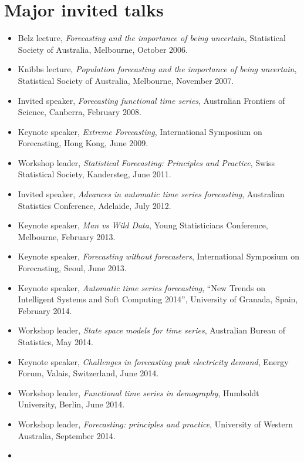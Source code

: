 \documentclass[10pt,a4paper,]{article}
\providecommand{\tightlist}{%
  \setlength{\itemsep}{0pt}\setlength{\parskip}{0pt}}
\begin{document}
\hypertarget{major-invited-talks}{%
\section{Major invited talks}\label{major-invited-talks}}

\begin{itemize}
\tightlist
\item
  Belz lecture, \emph{Forecasting and the importance of being
  uncertain}, Statistical Society of Australia, Melbourne, October 2006.
\item
  Knibbs lecture, \emph{Population forecasting and the importance of
  being uncertain}, Statistical Society of Australia, Melbourne,
  November 2007.
\item
  Invited speaker, \emph{Forecasting functional time series}, Australian
  Frontiers of Science, Canberra, February 2008.
\item
  Keynote speaker, \emph{Extreme Forecasting}, International Symposium
  on Forecasting, Hong Kong, June 2009.
\item
  Workshop leader, \emph{Statistical Forecasting: Principles and
  Practice}, Swiss Statistical Society, Kandersteg, June 2011.
\item
  Invited speaker, \emph{Advances in automatic time series forecasting},
  Australian Statistics Conference, Adelaide, July 2012.
\item
  Keynote speaker, \emph{Man vs Wild Data}, Young Statisticians
  Conference, Melbourne, February 2013.
\item
  Keynote speaker, \emph{Forecasting without forecasters}, International
  Symposium on Forecasting, Seoul, June 2013.
\item
  Keynote speaker, \emph{Automatic time series forecasting}, ``New
  Trends on Intelligent Systems and Soft Computing 2014'', University of
  Granada, Spain, February 2014.
\item
  Workshop leader, \emph{State space models for time series}, Australian
  Bureau of Statistics, May 2014.
\item
  Keynote speaker, \emph{Challenges in forecasting peak electricity
  demand}, Energy Forum, Valais, Switzerland, June 2014.
\item
  Workshop leader, \emph{Functional time series in demography}, Humboldt
  University, Berlin, June 2014.
\item
  Workshop leader, \emph{Forecasting: principles and practice},
  University of Western Australia, September 2014.
\item

\end{itemize}
\end{document}
